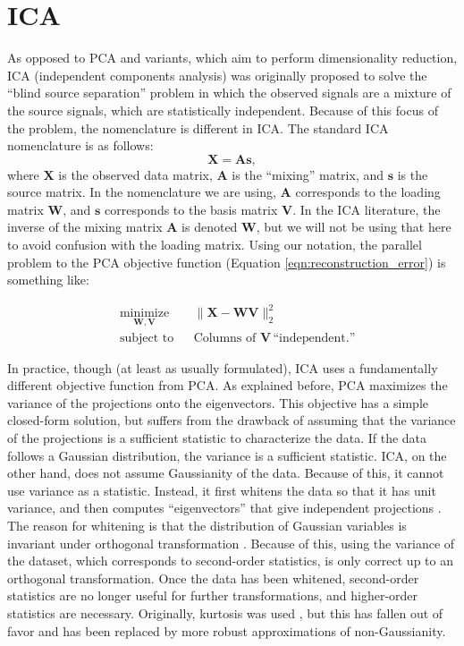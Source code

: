 \documentclass{article}
\begin{document}
\section*{ICA}
As opposed to PCA and variants, which aim to perform dimensionality reduction, ICA (independent components analysis) was originally proposed to solve the ``blind source separation'' problem in which the observed signals are a mixture of the source signals, which are statistically independent.  Because of this focus of the problem, the nomenclature is different in ICA.  The standard ICA nomenclature is as follows: 
\begin{equation}
\mathbf{X} = \mathbf{As},
\end{equation}
where $\mathbf{X}$ is the observed data matrix, $\mathbf{A}$ is the ``mixing'' matrix, and $\mathbf{s}$ is the source matrix.  In the nomenclature we are using, $\mathbf{A}$ corresponds to the loading matrix $\mathbf{W}$, and $\mathbf{s}$ corresponds to the basis matrix $\mathbf{V}$.  In the ICA literature, the inverse of the mixing matrix $\mathbf{A}$ is denoted $\mathbf{W}$, but we will not be using that here to avoid confusion with the loading matrix.  Using our notation, the parallel problem to the PCA objective function (Equation \ref{eqn:reconstruction_error}) is something like: 

\begin{equation}
\begin{aligned}
& \underset{\mathbf{W}, \mathbf{V}}{\text{minimize}} & &  \| \mathbf{X} - \mathbf{WV}  \|_2^2 \\ 
&\text{subject to} & & \text{Columns of } \mathbf{V} \, \text{``independent.''}
\end{aligned}
\label{eqn:ica}
\end{equation}

In practice, though (at least as usually formulated), ICA uses a fundamentally different objective function from PCA. As explained before,  PCA maximizes the variance of the projections onto the eigenvectors.  This objective has a simple closed-form solution, but suffers from the drawback of assuming that the variance of the projections is a sufficient statistic to characterize the data.  If the data follows a Gaussian distribution, the variance is a sufficient statistic.  ICA, on the other hand, does not assume Gaussianity of the data.  Because of this, it cannot use variance as a statistic.  Instead, it first whitens the data so that it has unit variance, and then computes ``eigenvectors'' that give independent projections \cite{comon_independent_1994,hyvarinen_fast_1999,hyvarinen_independent_2000}.  The reason for whitening is that the distribution of Gaussian variables is invariant under orthogonal transformation \cite{comon_independent_1994}.  Because of this, using the variance of the dataset, which corresponds to second-order statistics, is only correct up to an orthogonal transformation.  Once the data has been whitened, second-order statistics are no longer useful for further transformations, and higher-order statistics are necessary.  Originally, kurtosis was used \cite{cardoso_source_1989}, but this has fallen out of favor and has been replaced by more robust approximations of non-Gaussianity. 
\end{document}
